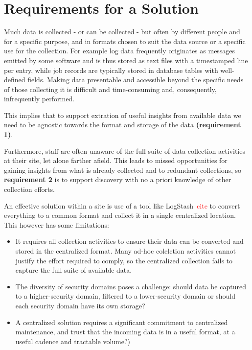 \section{Requirements for a Solution}
\label{s:requirements}


Much data is collected - or can be collected - but often by different
people and for a specific purpose, and in formats chosen to suit the 
data source or a specific use for the collection. 
For example log data frequently originates 
as messages emitted by some software and is thus stored as
text files with a timestamped line per entry, while job records
are typically stored in database tables with well-defined fields.
Making data presentable and accessible beyond the specific needs of those
collecting it is difficult and time-consuming and, consequently, 
infrequently performed. 

This implies that to support extration of useful insights from available data 
we need to be agnostic towards the format and storage of the data
\textbf{(requirement 1)}.

Furthermore, staff are often unaware of the full suite of data collection 
activities at their site, let alone farther afield. This leads to missed 
opportunities for gaining insights from what is already collected and 
to redundant collections, so \textbf{requirement 2} is to support 
discovery with no a priori knowledge of other collection efforts.

An effective solution within a site is 
use of a tool like LogStash~\textcolor{red}{cite} 
to convert everything to a common format and collect it in a single 
centralized location. This however has some limitations:

\begin{itemize}
\item It requires all collection activities to ensure their data can
      be converted and stored in the centralized format. Many ad-hoc
      colelction activities cannot justify the effort required to 
      comply, so the centralized collection fails to capture the full
      suite of available data.
\item The diversity of security domains poses a challenge: should data
      be captured to a higher-security domain, filtered to a lower-security
      domain or should each security domain have its own storage?
\item A centralized solution requires a significant commitment to
      centralized maintenance, and trust that the incoming data is 
      in a useful format, at a useful cadence and
      tractable volume?)
\end{itemize}

